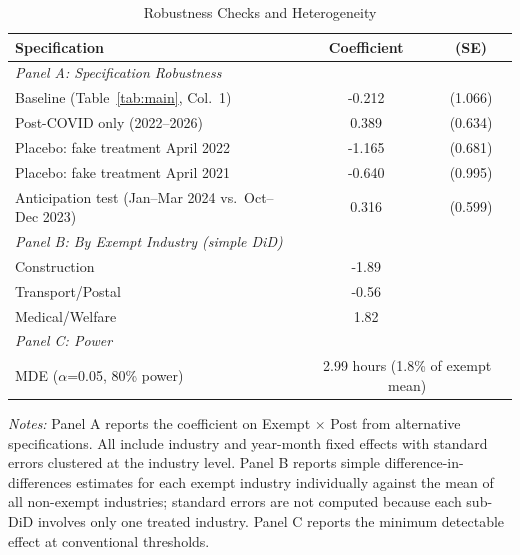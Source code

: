 \begin{table}[H]
\centering
\caption{Robustness Checks and Heterogeneity}
\label{tab:robustness}
\begin{threeparttable}
\begin{tabular}{lcc}
\toprule
Specification & Coefficient & (SE) \\
\midrule
\multicolumn{3}{l}{\textit{Panel A: Specification Robustness}} \\
Baseline (Table~\ref{tab:main}, Col.~1) & -0.212 & (1.066) \\
Post-COVID only (2022--2026) & 0.389 & (0.634) \\
Placebo: fake treatment April 2022 & -1.165 & (0.681) \\
Placebo: fake treatment April 2021 & -0.640 & (0.995) \\
Anticipation test (Jan--Mar 2024 vs.~Oct--Dec 2023) & 0.316 & (0.599) \\
\midrule
\multicolumn{3}{l}{\textit{Panel B: By Exempt Industry (simple DiD)}} \\
Construction & -1.89 & \\
Transport/Postal & -0.56 & \\
Medical/Welfare & 1.82 & \\
\midrule
\multicolumn{3}{l}{\textit{Panel C: Power}} \\
MDE ($\alpha$=0.05, 80\% power) & \multicolumn{2}{c}{2.99 hours (1.8\% of exempt mean)} \\
\bottomrule
\end{tabular}
\begin{tablenotes}[flushleft]
\small
\item \textit{Notes:} Panel A reports the coefficient on Exempt $\times$ Post from alternative specifications. All include industry and year-month fixed effects with standard errors clustered at the industry level. Panel B reports simple difference-in-differences estimates for each exempt industry individually against the mean of all non-exempt industries; standard errors are not computed because each sub-DiD involves only one treated industry. Panel C reports the minimum detectable effect at conventional thresholds.
\end{tablenotes}
\end{threeparttable}
\end{table}
